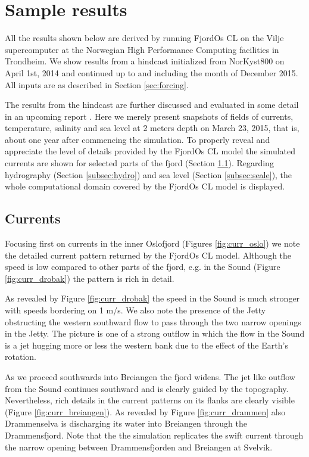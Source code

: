 \section{Sample results}
\label{sec:resul}
All the results shown below are derived by running FjordOs CL on the Vilje supercomputer at the Norwegian High Performance Computing facilities in Trondheim. We show results from a hindcast initialized from NorKyst800 on April 1st, 2014 and continued up to and including the month of December 2015. All inputs are as described in Section \ref{sec:forcing}.
 
The results from the hindcast are further discussed and evaluated in some detail in an upcoming report \citep{hjelm:etal:2016}. Here we merely present snapshots of fields of currents, temperature, salinity and sea level at 2 meters depth on March 23, 2015, that is, about one year after commencing the simulation. To properly reveal and appreciate the level of details provided by the FjordOs CL model the simulated currents are shown for selected parts of the fjord (Section \ref{subsec:curre}). Regarding hydrography (Section \ref{subsec:hydro}) and sea level (Section \ref{subsec:seale}), the whole computational domain covered by the FjordOs CL model is displayed.  %

\subsection{Currents}
\label{subsec:curre}
Focusing first on currents in the inner Oslofjord (Figures \ref{fig:curr_oslo}) we note the detailed current pattern returned by the FjordOs CL model. Although the speed is low compared to other parts of the fjord, e.g. in the {\DR} Sound (Figure \ref{fig:curr_drobak}) the pattern is rich in detail. 
 

As revealed by Figure \ref{fig:curr_drobak} the speed in the {\DR} Sound is much stronger with speeds bordering on 1 m/s. We also note the presence of the Jetty obstructing the western southward flow to pass through the two narrow openings in the Jetty. The picture is one of a strong outflow in which the flow in the {\DR} Sound is a jet hugging more or less the western bank due to the effect of the Earth's rotation.   
 

As we proceed southwards into Breiangen the fjord widens. The jet like outflow from the {\DR} Sound continues southward and is clearly guided by the topography. Nevertheless, rich details in the current patterns on its flanks  are clearly visible (Figure \ref{fig:curr_breiangen}). As revealed by Figure \ref{fig:curr_drammen} also Drammenselva is discharging its water into Breiangen through the Drammensfjord. Note that the the simulation replicates the swift current through the narrow opening between Drammensfjorden and Breiangen at Svelvik.  
\clearpage
   
 

